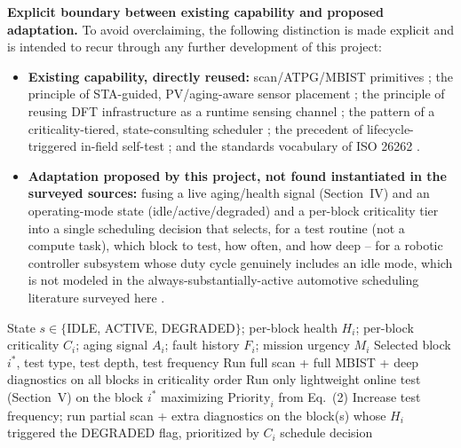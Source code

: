 \documentclass[journal]{IEEEtran}
\begin{document}
\textbf{Explicit boundary between existing capability and proposed adaptation.} To avoid overclaiming, the following distinction is made explicit and is intended to recur through any further development of this project:
\begin{itemize}
\item \textbf{Existing capability, directly reused:} scan/ATPG/MBIST primitives \cite{r1,r2,r19}; the principle of STA-guided, PV/aging-aware sensor placement \cite{r4,r5,r13,r14}; the principle of reusing DFT infrastructure as a runtime sensing channel \cite{r6,r15}; the pattern of a criticality-tiered, state-consulting scheduler \cite{r18}; the precedent of lifecycle-triggered in-field self-test \cite{r9}; and the standards vocabulary of ISO 26262 \cite{r10}.
\item \textbf{Adaptation proposed by this project, not found instantiated in the surveyed sources:} fusing a live aging/health signal (Section~IV) and an operating-mode state (idle/active/degraded) and a per-block criticality tier into a single scheduling decision that selects, for a test routine (not a compute task), which block to test, how often, and how deep -- for a robotic controller subsystem whose duty cycle genuinely includes an idle mode, which is not modeled in the always-substantially-active automotive scheduling literature surveyed here \cite{r18}.
\end{itemize}

\begin{algorithm}[t]
\caption{Reliability-Aware Test Scheduling (Proposed / Survey-Derived Synthesis)}
\label{alg:sched}
\begin{algorithmic}[1]
\Require State $s\in\{$IDLE, ACTIVE, DEGRADED$\}$; per-block health $H_i$; per-block criticality $C_i$; aging signal $A_i$; fault history $F_i$; mission urgency $M_i$
\Ensure Selected block $i^*$, test type, test depth, test frequency
  \State Run full scan + full MBIST + deep diagnostics on all blocks in criticality order
  \State Run only lightweight online test (Section~V) on the block $i^*$ maximizing $\mathrm{Priority}_i$ from Eq.~(2)
  \State Increase test frequency; run partial scan + extra diagnostics on the block(s) whose $H_i$ triggered the DEGRADED flag, prioritized by $C_i$
\EndIf
\State \Return schedule decision
\end{algorithmic}
\end{algorithm}
\end{document}
